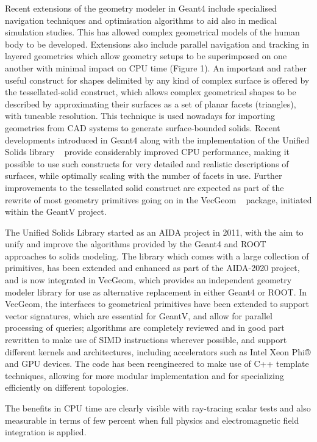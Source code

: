 \documentclass[12pt,a4paper]{article}
\begin{document}
Recent extensions of the geometry modeler in Geant4 include specialised
navigation techniques and optimisation algorithms to aid also in medical
simulation studies. This has allowed complex geometrical models of the
human body to be developed. Extensions also include parallel navigation
and tracking in layered geometries which allow geometry setups to be
superimposed on one another with minimal impact on CPU time (Figure 1).
An important and rather useful construct for shapes delimited by any
kind of complex surface is offered by the tessellated-solid construct,
which allows complex geometrical shapes to be described by approximating
their surfaces as a set of planar facets (triangles), with tuneable
resolution. This technique is used nowadays for importing geometries
from CAD systems to generate surface-bounded solids. Recent developments
introduced in Geant4 along with the implementation of the Unified Solids
library ~\cite{1742-6596-396-5-052035} provide considerably improved CPU performance, making
it possible to use such constructs for very detailed and realistic
descriptions of surfaces, while optimally scaling with the number of
facets in use. Further improvements to the tessellated solid construct
are expected as part of the rewrite of most geometry primitives going on
in the VecGeom ~\cite{1742-6596-608-1-012023} package, initiated within 
the GeantV project.

The Unified Solids Library started as an AIDA project in 2011, with the
aim to unify and improve the algorithms provided by the Geant4 and ROOT
~\cite{Brun1996} approaches to solids modeling. The library which comes with a
large collection of primitives, has been extended and enhanced as part
of the AIDA-2020 project, and is now integrated in VecGeom, which
provides an independent geometry modeler library for use as alternative
replacement in either Geant4 or ROOT. In VecGeom, the interfaces to
geometrical primitives have been extended to support vector signatures,
which are essential for GeantV, and allow for parallel processing of
queries; algorithms are completely reviewed and in good part rewritten
to make use of SIMD instructions wherever possible, and support
different kernels and architectures, including accelerators such as
Intel Xeon Phi® and GPU devices. The code has been reengineered to make
use of C++ template techniques, allowing for more modular implementation
and for specializing efficiently on different topologies.

The benefits in CPU time are clearly visible with ray-tracing scalar
tests and also measurable in terms of few percent when full physics and
electromagnetic field integration is applied.
\end{document}
